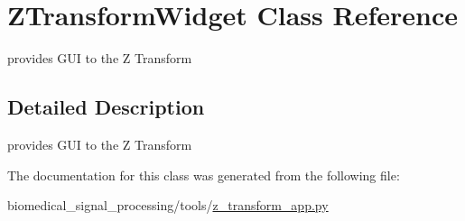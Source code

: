 \hypertarget{classZTransformWidget}{}\section{Z\+Transform\+Widget Class Reference}
\label{classZTransformWidget}


provides G\+UI to the Z Transform  




\subsection{Detailed Description}
provides G\+UI to the Z Transform 

The documentation for this class was generated from the following file\+:\begin{DoxyCompactItemize}
\item 
biomedical\+\_\+signal\+\_\+processing/tools/\hyperlink{z__transform__app_8py}{z\+\_\+transform\+\_\+app.\+py}\end{DoxyCompactItemize}

